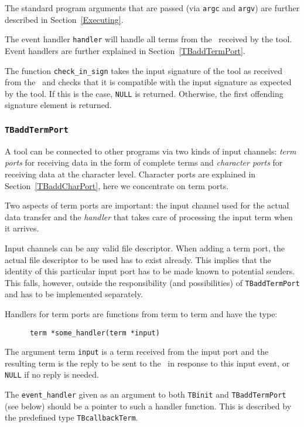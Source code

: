 \documentclass[a4,twoside,noweb]{article} %
\begin{document}
The standard program arguments that are passed (via  {\tt argc} and {\tt argv})
are further described in Section~\ref{Executing}.

The event handler {\tt handler} will handle all terms
from the \TB\  received by the tool. Event handlers are further explained
in Section~\ref{TBaddTermPort}.

The function {\tt check\_in\_sign} takes the input signature of the
tool as received from the \TB\ and checks that it is compatible with
the input signature as expected by the tool.  If this is the case,
{\tt NULL} is returned.  Otherwise, the first offending
signature element is returned.

\subsubsection{\label{TBaddTermPort}{\tt TBaddTermPort}}

A tool can be connected to other programs via two kinds of input channels:
{\em term ports} for receiving data in the form of complete
terms  and {\em character ports} for receiving data at the character level.
Character ports are explained in Section~\ref{TBaddCharPort}, here we concentrate on
term ports.

Two aspects of term ports are important: the input channel used for
the actual data transfer and the {\em handler} that takes care of processing
the input term when it arrives.

Input channels can be any valid file descriptor.  When adding a term
port, the actual file descriptor to be used has to exist already.
This implies that the identity of this particular input port has to be
made known to potential senders. This falls, however,
outside the responsibility (and possibilities) of {\tt TBaddTermPort}
and has to be implemented separately.

Handlers for term ports are functions from term to term and have the
type:
\begin{verbatim}
      term *some_handler(term *input)
\end{verbatim}
The argument term {\tt input} is a term received from the input port
and the resulting term is the reply to be sent  to the \TB\ in response
to this input event, or {\tt NULL} if no reply is needed.

The {\tt event\_handler} given as an argument to both {\tt TBinit} and
{\tt TBaddTermPort} (see below) should be a pointer to such a handler function.
This is described by the predefined type {\tt TBcallbackTerm}.
\end{document}
